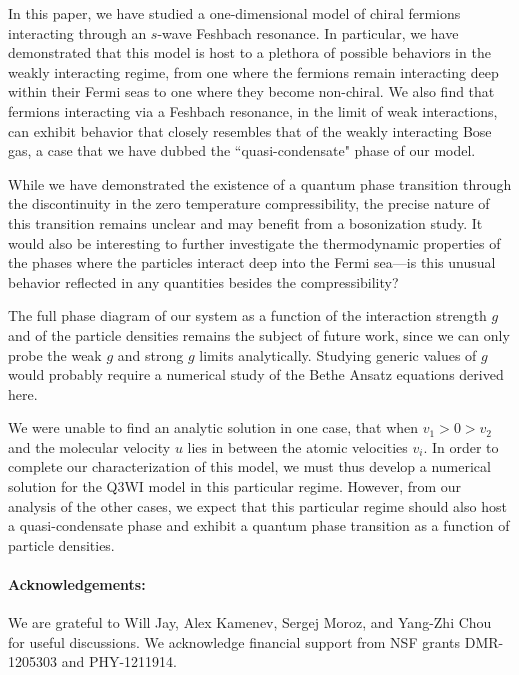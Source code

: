 \documentclass[aps,pra,
superscriptaddress,
reprint,twocolumn,preprintnumbers,
amsmath,amssymb,
nofootinbib]{revtex4-1}
\begin{document}
In this paper, we have studied a one-dimensional model of chiral fermions interacting through an $s$-wave Feshbach resonance. In particular, we have demonstrated that this model is host to a plethora of possible behaviors in the weakly interacting regime, from one where the fermions remain interacting deep within their Fermi seas to one where they become non-chiral. We also find that fermions interacting via a Feshbach resonance, in the limit of weak interactions, can exhibit behavior that closely resembles that of the weakly interacting Bose gas, a case that we have dubbed the ``quasi-condensate" phase of our model.

While we have demonstrated the existence of a quantum phase transition through the discontinuity in the zero temperature compressibility, the precise nature of this transition remains unclear and may benefit from a bosonization study. It would also be interesting to further investigate the thermodynamic properties of the phases where the particles interact deep into the Fermi sea---is this unusual behavior reflected in any quantities besides the compressibility?

The full phase diagram of our system as a function of the interaction strength $g$ and of the particle densities remains the subject of future work, since we can only probe the weak $g$ and strong $g$ limits analytically. Studying generic values of $g$ would probably require a numerical study of the Bethe Ansatz equations derived here.

We were unable to find an analytic solution in one case, that when $v_1>0>v_2$ and the molecular velocity $u$ lies in between the atomic velocities $v_i$. In order to complete our characterization of this model, we must thus develop a numerical solution for the Q3WI model in this particular regime. However, from our analysis of the other cases, we expect that this particular regime should also host a quasi-condensate phase and exhibit a quantum phase transition as a function of particle densities. \\

\paragraph*{Acknowledgements:} We are grateful to Will Jay, Alex Kamenev, Sergej Moroz, and Yang-Zhi Chou for useful discussions. We acknowledge financial support from NSF grants DMR-1205303 and PHY-1211914.

\end{document}
